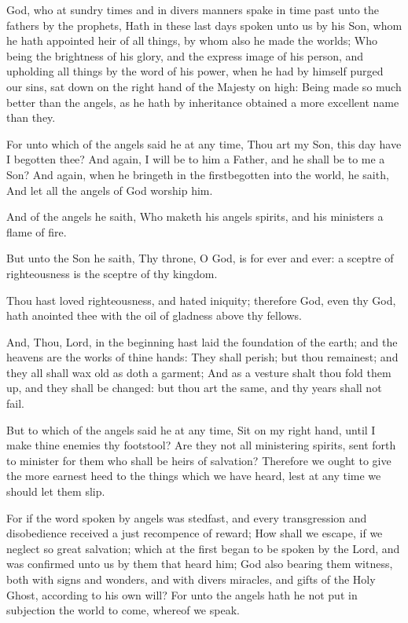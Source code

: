\Chapter
\Verse God, who at sundry times and in divers manners spake in time past unto the fathers by the prophets, \Verse Hath in these last days spoken unto us by his Son, whom he hath appointed heir of all things, by whom also he made the worlds; \Verse Who being the brightness of his glory, and the express image of his person, and upholding all things by the word of his power, when he had by himself purged our sins, sat down on the right hand of the Majesty on high: \Verse Being made so much better than the angels, as he hath by inheritance obtained a more excellent name than they.

\Verse For unto which of the angels said he at any time, Thou art my Son, this day have I begotten thee? And again, I will be to him a Father, and he shall be to me a Son?  \Verse And again, when he bringeth in the firstbegotten into the world, he saith, And let all the angels of God worship him.

\Verse And of the angels he saith, Who maketh his angels spirits, and his ministers a flame of fire.

\Verse But unto the Son he saith, Thy throne, O God, is for ever and ever: a sceptre of righteousness is the sceptre of thy kingdom.

\Verse Thou hast loved righteousness, and hated iniquity; therefore God, even thy God, hath anointed thee with the oil of gladness above thy fellows.

\Verse And, Thou, Lord, in the beginning hast laid the foundation of the earth; and the heavens are the works of thine hands: \Verse They shall perish; but thou remainest; and they all shall wax old as doth a garment; \Verse And as a vesture shalt thou fold them up, and they shall be changed: but thou art the same, and thy years shall not fail.

\Verse But to which of the angels said he at any time, Sit on my right hand, until I make thine enemies thy footstool?  \Verse Are they not all ministering spirits, sent forth to minister for them who shall be heirs of salvation?  
\Chapter
\Verse Therefore we ought to give the more earnest heed to the things which we have heard, lest at any time we should let them slip.

\Verse For if the word spoken by angels was stedfast, and every transgression and disobedience received a just recompence of reward; \Verse How shall we escape, if we neglect so great salvation; which at the first began to be spoken by the Lord, and was confirmed unto us by them that heard him; \Verse God also bearing them witness, both with signs and wonders, and with divers miracles, and gifts of the Holy Ghost, according to his own will?  \Verse For unto the angels hath he not put in subjection the world to come, whereof we speak.

